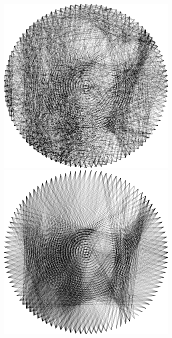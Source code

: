 \begin{figure}[H]
    \centering
    \begin{minipage}{0.2\linewidth}
        \centering
        \includegraphics[width=\linewidth]{images/mp/greedy_random.png}
    \end{minipage}
    \begin{minipage}{0.2\linewidth}
        \centering
        \includegraphics[width=\linewidth]{images/mp/greedy_dotproduct.png}

\end{minipage}
\end{figure}
